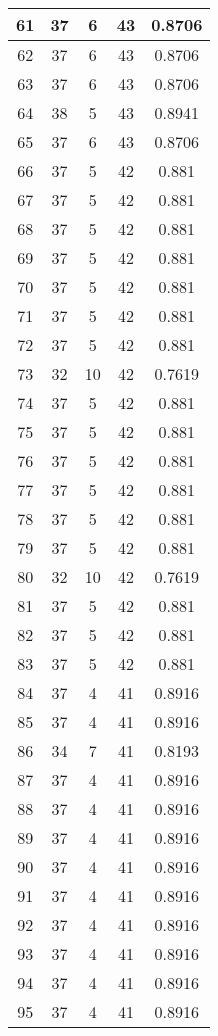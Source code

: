 \documentclass[letterpaper, 12pt]{article}
\begin{document}
\begin{longtable}{|c|c|c|c|c|}
61 & 37 & 6 & 43 & 0.8706 \\
\hline
62 & 37 & 6 & 43 & 0.8706 \\
\hline
63 & 37 & 6 & 43 & 0.8706 \\
\hline
64 & 38 & 5 & 43 & 0.8941 \\
\hline
65 & 37 & 6 & 43 & 0.8706 \\
\hline
66 & 37 & 5 & 42 & 0.881 \\
\hline
67 & 37 & 5 & 42 & 0.881 \\
\hline
68 & 37 & 5 & 42 & 0.881 \\
\hline
69 & 37 & 5 & 42 & 0.881 \\
\hline
70 & 37 & 5 & 42 & 0.881 \\
\hline
71 & 37 & 5 & 42 & 0.881 \\
\hline
72 & 37 & 5 & 42 & 0.881 \\
\hline
73 & 32 & 10 & 42 & 0.7619 \\
\hline
74 & 37 & 5 & 42 & 0.881 \\
\hline
75 & 37 & 5 & 42 & 0.881 \\
\hline
76 & 37 & 5 & 42 & 0.881 \\
\hline
77 & 37 & 5 & 42 & 0.881 \\
\hline
78 & 37 & 5 & 42 & 0.881 \\
\hline
79 & 37 & 5 & 42 & 0.881 \\
\hline
80 & 32 & 10 & 42 & 0.7619 \\
\hline
81 & 37 & 5 & 42 & 0.881 \\
\hline
82 & 37 & 5 & 42 & 0.881 \\
\hline
83 & 37 & 5 & 42 & 0.881 \\
\hline
84 & 37 & 4 & 41 & 0.8916 \\
\hline
85 & 37 & 4 & 41 & 0.8916 \\
\hline
86 & 34 & 7 & 41 & 0.8193 \\
\hline
87 & 37 & 4 & 41 & 0.8916 \\
\hline
88 & 37 & 4 & 41 & 0.8916 \\
\hline
89 & 37 & 4 & 41 & 0.8916 \\
\hline
90 & 37 & 4 & 41 & 0.8916 \\
\hline
91 & 37 & 4 & 41 & 0.8916 \\
\hline
92 & 37 & 4 & 41 & 0.8916 \\
\hline
93 & 37 & 4 & 41 & 0.8916 \\
\hline
94 & 37 & 4 & 41 & 0.8916 \\
\hline
95 & 37 & 4 & 41 & 0.8916 \\

\end{longtable}
\end{document}
